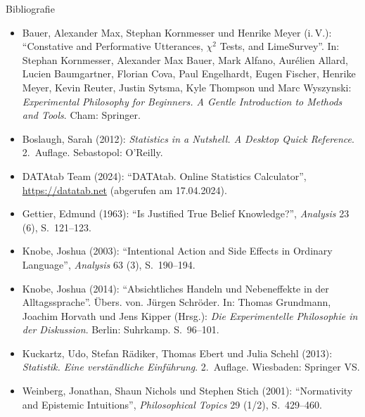 \documentclass[xcolor=table,9pt,aspectratio=169]{beamer}
\begin{document}
\begin{frame}{\vspace*{10mm}Bibliografie}
\vspace*{-5mm}
{\footnotesize
\begin{itemize}[label=,leftmargin=2em,itemindent=-2em]
   \item Bauer, Alexander Max, Stephan Kornmesser und Henrike Meyer (i.\,V.): \enquote{Constative and Performative Utterances, $\chi^2$ Tests, and LimeSurvey}. In: Stephan Kornmesser, Alexander Max Bauer, Mark Alfano, Aurélien Allard, Lucien Baumgartner, Florian Cova, Paul Engelhardt, Eugen Fischer, Henrike Meyer, Kevin Reuter, Justin Sytsma, Kyle Thompson und Marc Wyszynski: \textit{Experimental Philosophy for Beginners. A Gentle Introduction to Methods and Tools}. Cham: Springer.
   \item Boslaugh, Sarah (2012): \textit{Statistics in a Nutshell. A Desktop Quick Reference}. 2.~Auflage. Sebastopol: O'Reilly.
   \item DATAtab Team (2024): \enquote{DATAtab. Online Statistics Calculator}, \url{https://datatab.net} (abgerufen am 17.04.2024).
   \item Gettier, Edmund (1963): \enquote{Is Justified True Belief Knowledge?}, \textit{Analysis} 23 (6), S.~121--123.
   \item Knobe, Joshua (2003): \enquote{Intentional Action and Side Effects in Ordinary Language}, \textit{Analysis} 63 (3), S.~190--194.
   \item Knobe, Joshua (2014): \enquote{Absichtliches Handeln und Nebeneffekte in der Alltagssprache}. Übers. von. Jürgen Schröder. In: Thomas Grundmann, Joachim Horvath und Jens Kipper (Hrsg.): \textit{Die Experimentelle Philosophie in der Diskussion}. Berlin: Suhrkamp. S.~96--101.
   \item Kuckartz, Udo, Stefan Rädiker, Thomas Ebert und Julia Schehl (2013): \textit{Statistik. Eine verständliche Einführung}. 2.~Auflage. Wiesbaden: Springer VS.
   \item Weinberg, Jonathan, Shaun Nichols und Stephen Stich (2001): \enquote{Normativity and Epistemic Intuitions}, \textit{Philosophical Topics} 29 (1/2), S.~429--460.
\end{itemize}
}
\end{frame}
\end{document}
